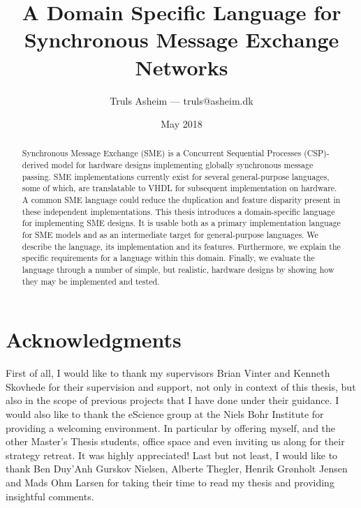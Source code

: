 \documentclass[oneside,a4paper,oldfontcommands]{memoir}
\author{Truls Asheim --- {\ttfamily truls@asheim.dk}}
\title{A Domain Specific Language for Synchronous Message Exchange Networks}
\date{May 2018}
\begin{document}

\frontmatter

\begin{titlingpage}
\maketitle
\end{titlingpage}

\newpage
\begin{abstract}
  Synchronous Message Exchange (SME) is a Concurrent Sequential Processes
  (CSP)-derived model for hardware designs implementing globally synchronous
  message passing. SME implementations currently exist for several
  general-purpose languages, some of which, are translatable to VHDL for
  subsequent implementation on hardware. A common SME language could reduce the
  duplication and feature disparity present in these independent
  implementations. This thesis introduces a domain-specific language for
  implementing SME designs. It is usable both as a primary implementation
  language for SME models and as an intermediate target for general-purpose
  languages. We describe the language, its implementation and its
  features. Furthermore, we explain the specific requirements for a language
  within this domain. Finally, we evaluate the language through a number of
  simple, but realistic, hardware designs by showing how they may be implemented
  and tested.
\end{abstract}
\newpage


\chapter{Acknowledgments}
First of all, I would like to thank my supervisors Brian Vinter and Kenneth
Skovhede for their supervision and support, not only in context of this thesis,
but also in the scope of previous projects that I have done under their
guidance.  I would also like to thank the eScience group at the Niels Bohr
Institute for providing a welcoming environment. In particular by offering
myself, and the other Master's Thesis students, office space and even inviting
us along for their strategy retreat. It was highly appreciated! Last but not
least, I would like to thank Ben Duy'Anh Gurskov Nielsen, Alberte Thegler,
Henrik Grønholt Jensen and Mads Ohm Larsen for taking their time to read my
thesis and providing insightful comments.

\newpage
\tableofcontents
\end{document}

